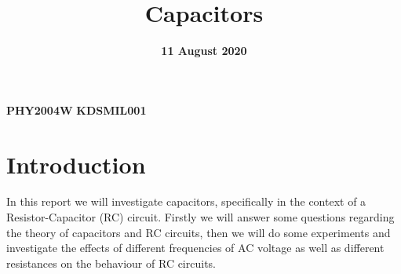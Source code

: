 \documentclass[12pt]{article}
\title{Capacitors}
\date{\textbf{11 August 2020}}
\author{}
\numberwithin{equation}{section}
\numberwithin{figure}{section}
\begin{document}
    \begin{titlepage}
        \maketitle
        \center
        \textbf{\large{PHY2004W}}
        \textbf{\large{KDSMIL001}}
        \tableofcontents
    \end{titlepage}
    
    \section{Introduction}
    In this report we will investigate capacitors, specifically in the context of a 
    Resistor-Capacitor (RC) circuit. Firstly we will answer some questions regarding the theory 
    of capacitors and RC circuits, then we will do some experiments and investigate the effects 
    of different frequencies of AC voltage as well as different resistances on the behaviour 
    of RC circuits.
\end{document}
